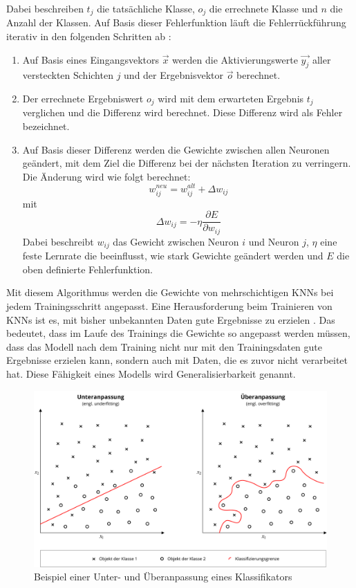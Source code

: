 Dabei beschreiben $t_j$ die tatsächliche Klasse, $o_j$ die errechnete Klasse und $n$ die Anzahl der Klassen. Auf Basis dieser Fehlerfunktion läuft die Fehlerrückführung iterativ in den folgenden Schritten ab \cite{bishop2006pattern}:

\begin{enumerate}
\item Auf Basis eines Eingangsvektors $\vec{x}$ werden die Aktivierungswerte $\vec{y_j}$ aller versteckten Schichten $j$ und der Ergebnisvektor $\vec{o}$ berechnet.
\item Der errechnete Ergebniswert $o_j$ wird mit dem erwarteten Ergebnis $t_j$ verglichen und die Differenz wird berechnet. Diese Differenz wird als Fehler bezeichnet.
\item Auf Basis dieser Differenz werden die Gewichte zwischen allen Neuronen geändert, mit dem Ziel die Differenz bei der nächsten Iteration zu verringern. Die Änderung wird wie folgt berechnet:
\begin{equation}
w^{neu}_{ij} = w^{alt}_{ij} + \Delta w_{ij}
\end{equation}
mit
\begin{equation}
\Delta w_{ij} = -\eta \frac{\partial E}{\partial w_{ij}}
\end{equation}
Dabei beschreibt $w_{ij}$ das Gewicht zwischen Neuron $i$ und Neuron $j$, $\eta$ eine feste Lernrate die beeinflusst, wie stark Gewichte geändert werden und $E$ die oben definierte Fehlerfunktion.
\end{enumerate}

Mit diesem Algorithmus werden die Gewichte von mehrschichtigen \acp{KNN} bei jedem Trainingsschritt angepasst. Eine Herausforderung beim Trainieren von \acp{KNN} ist es, mit bisher unbekannten Daten gute Ergebnisse zu erzielen \cite{srivastava2014dropout}. Das bedeutet, dass im Laufe des Trainings die Gewichte so angepasst werden müssen, dass das Modell nach dem Training nicht nur mit den Trainingsdaten gute Ergebnisse erzielen kann, sondern auch mit Daten, die es zuvor nicht verarbeitet hat. Diese Fähigkeit eines Modells wird Generalisierbarkeit genannt.

\begin{figure}[h]
\centering
\includegraphics[scale=0.4]{images/overfitting.pdf}
\caption{Beispiel einer Unter- und Überanpassung eines Klassifikators}
\label{fig_overfitting}
\end{figure}

